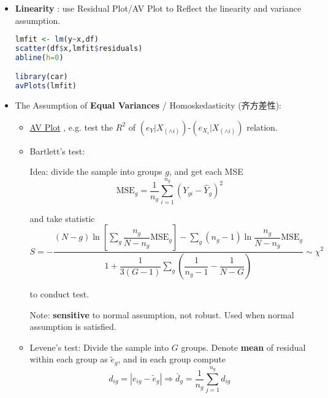 \begin{itemize}[topsep=2pt,itemsep=2pt]
    \item \textbf{Linearity} : use Residual Plot/AV Plot to Reflect the linearity and variance assumption.
    
\begin{rcode}
\begin{lstlisting}[language=R]
lmfit <- lm(y~x,df)
scatter(df$x,lmfit$residuals)
abline(h=0)

library(car)
avPlots(lmfit)
\end{lstlisting}

\end{rcode}
    \item The Assumption of \textbf{Equal Variances} / Homoskedasticity (齐方差性): 
    \begin{itemize}[topsep=2pt,itemsep=2pt]
        \item \hyperlink{AVPlot}{AV Plot} , e.g. test the $ R^2 $ of $ (e_Y|X_{(\wedge i)} )$-$( e_{X_i}|X_{(\wedge i)}) $ relation.
        \item Bartlett's test:
        
        Idea: divide the sample into groups $ g $, and get each MSE
        \begin{equation}
             \mathrm{MSE}_g=\dfrac{1}{n_g}\sum_{i=1}^{n_g}(Y_{gi}-\hat{Y}_g)^2
        \end{equation}
        
        and take statistic
        \begin{equation}
            S=-\dfrac{(N-g)\ln\left[ \sum\limits_g \dfrac{n_g}{N-n_g}\mathrm{MSE}_g \right]-\sum\limits_{g}(n_g-1)\ln \dfrac{n_g}{N-n_g}\mathrm{MSE}_g }{1+\dfrac{1}{3(G-1)}\sum\limits_g\left( \dfrac{1}{n_g-1}-\dfrac{1}{N-G} \right)} \sim \chi^2
        \end{equation}

        to conduct test. 

        Note: \textbf{sensitive}  to normal assumption, not robust. Used when normal assumption is satisfied.
        \item Levene's test: Divide the sample into $ G $ groups. Denote \textbf{mean}  of residual within each group as $ \tilde{e}_g $, and in each group compute
        \begin{equation}
            d_{ig}=|e_{ig}-\tilde{e}_g| \Rightarrow \bar{d}_{g}=\dfrac{1}{n_g}\sum_{j=1}^{n_g}d_{ig}
        \end{equation}


\end{itemize}
\end{itemize}
